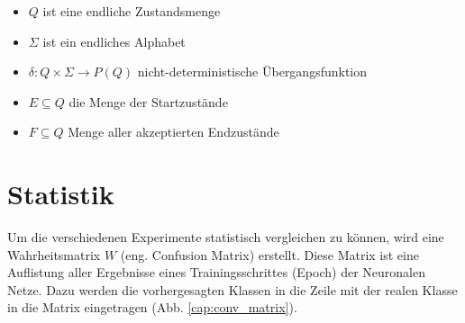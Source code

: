 \begin{itemize}
  \setlength\itemsep{-0.6em}
\item $Q$  ist eine endliche Zustandsmenge
\item $\Sigma$ ist ein endliches Alphabet
\item $\delta:Q \times \Sigma \rightarrow P(Q)$ nicht-deterministische Übergangsfunktion
\item $E \subseteq Q$ die Menge der Startzustände
\item $F \subseteq Q$ Menge aller akzeptierten Endzustände
\end{itemize}




\section{Statistik}\label{statistics}
Um die verschiedenen Experimente statistisch vergleichen zu können, wird eine Wahrheitsmatrix $W$ (eng. Confusion Matrix) erstellt. Diese Matrix ist eine Auflistung aller Ergebnisse eines Trainingsschrittes (Epoch) der Neuronalen Netze. Dazu werden die vorhergesagten Klassen in die Zeile mit der realen Klasse in die Matrix eingetragen (Abb. \ref{cap:conv_matrix}).

\def\myConfMat{{
{110,  25,  30},  %
{   0, 59,  31},  %
{   5, 35,  90},  %
}}

\def\classNames{{1, 2, 3}} %

\def\numClasses{3} %

\def\myScale{1.5} %

